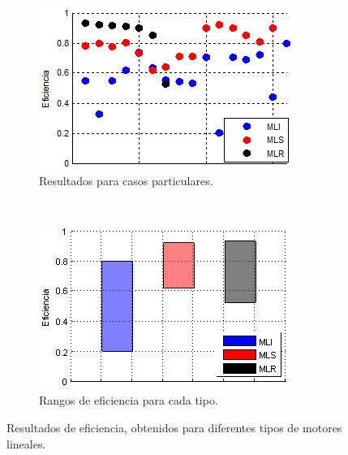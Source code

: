 \begin{figure}[t]
    \centering
    \begin{subfigure}[b]{0.49\textwidth}
        \includegraphics[width=\textwidth]{../img/effsdata.PNG}
        \caption{Resultados para casos particulares.}
        \label{fig:effsdata}
    \end{subfigure}
    ~ %
    \begin{subfigure}[b]{0.49\textwidth}
        \includegraphics[width=\textwidth]{../img/effsbands.PNG}
        \caption{Rangos de eficiencia para cada tipo.}
        \label{fig:effsbands}
    \end{subfigure}
    \caption{Resultados de eficiencia, obtenidos para diferentes tipos de motores lineales.}\label{fig:effs}
\end{figure}

